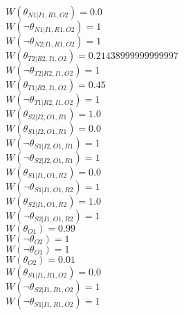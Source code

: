$W(\theta_{N1|I1,R1,O2})=0.0$\\
$W(\neg\theta_{N1|I1,R1,O2})=1$\\
$W(\neg\theta_{N2|I1,R1,O2})=1$\\
$W(\theta_{T2|R2,I1,O2})=0.21438999999999997$\\
$W(\neg\theta_{T2|R2,I1,O2})=1$\\
$W(\theta_{T1|R2,I1,O2})=0.45$\\
$W(\neg\theta_{T1|R2,I1,O2})=1$\\
$W(\theta_{S2|I2,O1,R1})=1.0$\\
$W(\theta_{S1|I2,O1,R1})=0.0$\\
$W(\neg\theta_{S1|I2,O1,R1})=1$\\
$W(\neg\theta_{S2|I2,O1,R1})=1$\\
$W(\theta_{S1|I1,O1,R2})=0.0$\\
$W(\neg\theta_{S1|I1,O1,R2})=1$\\
$W(\theta_{S2|I1,O1,R2})=1.0$\\
$W(\neg\theta_{S2|I1,O1,R2})=1$\\
$W(\theta_{O1})=0.99$\\
$W(\neg\theta_{O2})=1$\\
$W(\neg\theta_{O1})=1$\\
$W(\theta_{O2})=0.01$\\
$W(\theta_{S1|I1,R1,O2})=0.0$\\
$W(\neg\theta_{S2|I1,R1,O2})=1$\\
$W(\neg\theta_{S1|I1,R1,O2})=1$\\
